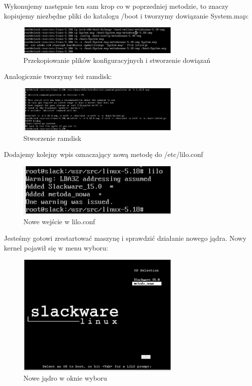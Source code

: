 \documentclass[12pt]{article}
\begin{document}
Wykonujemy następnie ten sam krop co w poprzedniej metodzie, to znaczy kopiujemy niezbędne pliki do katalogu /boot i tworzymy dowiązanie System.map:

\begin{figure}[H]
\centering
\includegraphics[width=8cm]{dowiazaniaxd.jpg}
\caption{Przekopiowanie plików konfiguracyjnych i stworzenie dowiązań}
\end{figure}

Analogicznie tworzymy też ramdisk:

\begin{figure}[H]
\centering
\includegraphics[width=8cm]{ramdiskkekw.jpg}
\caption{Stworzenie ramdisk}
\end{figure}

Dodajemy kolejny wpis oznaczający nową metodę do /etc/lilo.conf

\begin{figure}[H]
\centering
\includegraphics[width=8cm]{lilokomenda.jpg}
\caption{Nowe wejście w lilo.conf}
\end{figure}

Jesteśmy gotowi zrestartować maszynę i sprawdzić działanie nowego jądra. Nowy kernel pojawił się w menu wyboru:

\begin{figure}[H]
\centering
\includegraphics[width=8cm]{bootentry.jpg}
\caption{Nowe jądro w oknie wyboru}
\end{figure}
\end{document}
